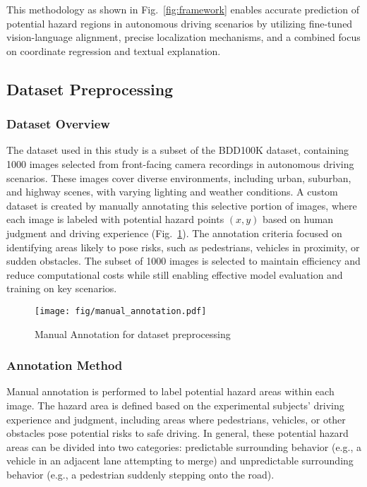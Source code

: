 % 
This methodology as shown in Fig.~\ref{fig:framework} enables accurate prediction of potential hazard regions in autonomous driving scenarios by utilizing fine-tuned vision-language alignment, precise localization mechanisms, and a combined focus on coordinate regression and textual explanation.


\subsection{Dataset Preprocessing}
\subsubsection{Dataset Overview}
The dataset used in this study is a subset of the BDD100K dataset, containing 1000 images selected from front-facing camera recordings in autonomous driving scenarios. These images cover diverse environments, including urban, suburban, and highway scenes, with varying lighting and weather conditions. A custom dataset is created by manually annotating this selective portion of images, where each image is labeled with potential hazard points $(x, y)$ based on human judgment and driving experience (Fig.~\ref{fig:manual_annotation}). The annotation criteria focused on identifying areas likely to pose risks, such as pedestrians, vehicles in proximity, or sudden obstacles. The subset of 1000 images is selected to maintain efficiency and reduce computational costs while still enabling effective model evaluation and training on key scenarios.
\begin{figure}[ht]
    \centering
    \texttt{[image: fig/manual\_annotation.pdf]}
    \caption{Manual Annotation for dataset preprocessing}
    \label{fig:manual_annotation}
\end{figure}

\subsubsection{Annotation Method}
Manual annotation is performed to label potential hazard areas within each image. The hazard area is defined based on the experimental subjects’ driving experience and judgment, including areas where pedestrians, vehicles, or other obstacles pose potential risks to safe driving. In general, these potential hazard areas can be divided into two categories: predictable surrounding behavior (e.g., a vehicle in an adjacent lane attempting to merge) and unpredictable surrounding behavior (e.g., a pedestrian suddenly stepping onto the road).

